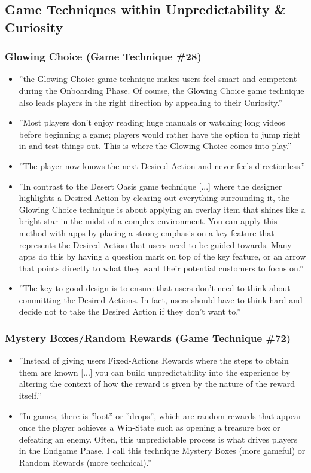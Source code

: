 \subsection{Game Techniques within Unpredictability \& Curiosity}
    \subsubsection{Glowing Choice (Game Technique \#28)}
        \begin{itemize}
            \item ''the Glowing Choice game technique makes users feel smart and competent during the Onboarding Phase. Of course, the Glowing Choice game technique also leads players in the right direction by appealing to their Curiosity.''
            \item ''Most players don't enjoy reading huge manuals or watching long videos before beginning a game; players would rather have the option to jump right in and test things out. This is where the Glowing Choice comes into play.''
            \item ''The player now knows the next Desired Action and never feels directionless.''
            \item ''In contrast to the Desert Oasis game technique [...] where the designer highlights a Desired Action by clearing out everything surrounding it, the Glowing Choice technique is about applying an overlay item that shines like a bright star in the midst of a complex environment. You can apply this method with apps by placing a strong emphasis on a key feature that represents the Desired Action that users need to be guided towards. Many apps do this by having a question mark on top of the key feature, or an arrow that points directly to what they want their potential customers to focus on.''
            \item ''The key to good design is to ensure that users don't need to think about committing the Desired Actions. In fact, users should have to think hard and decide not to take the Desired Action if they don't want to.''
        \end{itemize}
        
    \subsubsection{Mystery Boxes/Random Rewards (Game Technique \#72)}
        \begin{itemize}
            \item ''Instead of giving users Fixed-Actions Rewards where the steps to obtain them are known [...] you can build unpredictability into the experience by altering the context of how the reward is given by the nature of the reward itself.''
            \item ''In games, there is ''loot'' or ''drops'', which are random rewards that appear once the player achieves a Win-State such as opening a treasure box or defeating an enemy. Often, this unpredictable process is what drives players in the Endgame Phase. I call this technique Mystery Boxes (more gameful) or Random Rewards (more technical).''
        \end{itemize}
        
